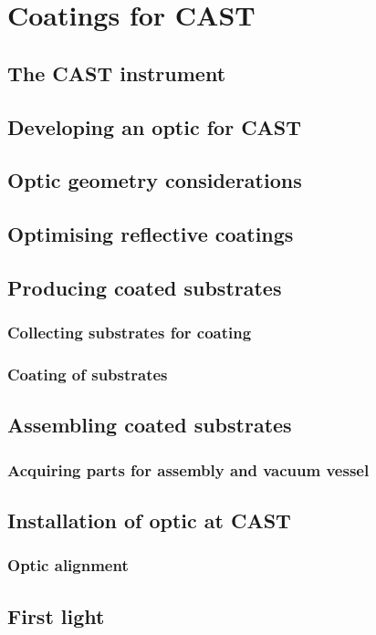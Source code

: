 \chapter{Coatings for CAST}

\section{The CAST instrument}



\section{Developing an optic for CAST}

\section{Optic geometry considerations}


\section{Optimising reflective coatings}


\section{Producing coated substrates}


\subsection{Collecting substrates for coating}

\subsection{Coating of substrates}



\section{Assembling coated substrates}


\subsection{Acquiring parts for assembly and vacuum vessel}


\section{Installation of optic at CAST}


\subsection{Optic alignment}


\section{First light}
